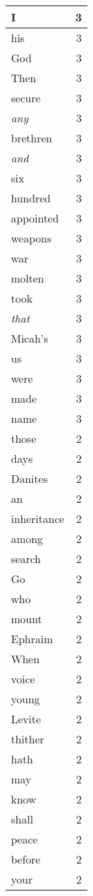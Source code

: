 \begin{center}
\begin{longtable}{l|r}
I & 3\\ \hline 
his & 3\\ \hline 
God & 3\\ \hline 
Then & 3\\ \hline 
secure & 3\\ \hline 
\emph{any} & 3\\ \hline 
brethren & 3\\ \hline 
\emph{and} & 3\\ \hline 
six & 3\\ \hline 
hundred & 3\\ \hline 
appointed & 3\\ \hline 
weapons & 3\\ \hline 
war & 3\\ \hline 
molten & 3\\ \hline 
took & 3\\ \hline 
\emph{that} & 3\\ \hline 
Micah's & 3\\ \hline 
us & 3\\ \hline 
were & 3\\ \hline 
made & 3\\ \hline 
name & 3\\ \hline 
those & 2\\ \hline 
days & 2\\ \hline 
Danites & 2\\ \hline 
an & 2\\ \hline 
inheritance & 2\\ \hline 
among & 2\\ \hline 
search & 2\\ \hline 
Go & 2\\ \hline 
who & 2\\ \hline 
mount & 2\\ \hline 
Ephraim & 2\\ \hline 
When & 2\\ \hline 
voice & 2\\ \hline 
young & 2\\ \hline 
Levite & 2\\ \hline 
thither & 2\\ \hline 
hath & 2\\ \hline 
may & 2\\ \hline 
know & 2\\ \hline 
shall & 2\\ \hline 
peace & 2\\ \hline 
before & 2\\ \hline 
your & 2\\ \hline 

\end{longtable}
\end{center}
